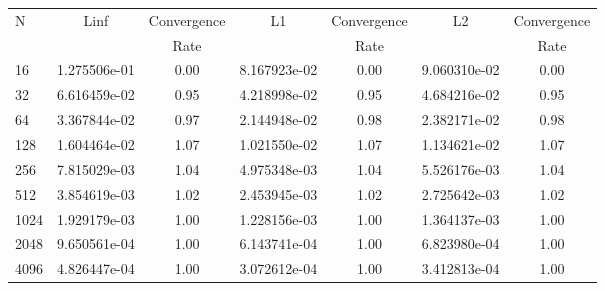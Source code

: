 \documentclass[12pt]{article}
\begin{document}
	\begin{tabular}{l|c|c|c|c|c|c}
		N&Linf&Convergence&L1&Convergence&L2&Convergence\\
		&&Rate&&Rate&&Rate\\
		\hline
		16&1.275506e-01&0.00&8.167923e-02&0.00&9.060310e-02&0.00\\
		\hline
		32&6.616459e-02&0.95&4.218998e-02&0.95&4.684216e-02&0.95\\
		\hline
		64&3.367844e-02&0.97&2.144948e-02&0.98&2.382171e-02&0.98\\
		\hline
		128&1.604464e-02&1.07&1.021550e-02&1.07&1.134621e-02&1.07\\
		\hline
		256&7.815029e-03&1.04&4.975348e-03&1.04&5.526176e-03&1.04\\
		\hline
		512&3.854619e-03&1.02&2.453945e-03&1.02&2.725642e-03&1.02\\
		\hline
		1024&1.929179e-03&1.00&1.228156e-03&1.00&1.364137e-03&1.00\\
		\hline
		2048&9.650561e-04&1.00&6.143741e-04&1.00&6.823980e-04&1.00\\
		\hline
		4096&4.826447e-04&1.00&3.072612e-04&1.00&3.412813e-04&1.00\\
	\end{tabular}
\end{document}
